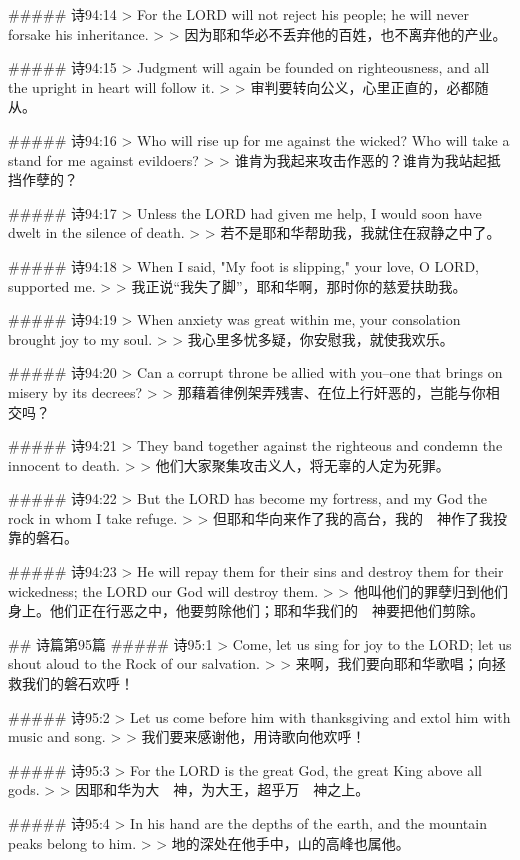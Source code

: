 ##### 诗94:14
> For the LORD will not reject his people; he will never forsake his inheritance.
>
> 因为耶和华必不丢弃他的百姓，也不离弃他的产业。


##### 诗94:15
> Judgment will again be founded on righteousness, and all the upright in heart will follow it.
>
> 审判要转向公义，心里正直的，必都随从。


##### 诗94:16
> Who will rise up for me against the wicked? Who will take a stand for me against evildoers?
>
> 谁肯为我起来攻击作恶的？谁肯为我站起抵挡作孽的？


##### 诗94:17
> Unless the LORD had given me help, I would soon have dwelt in the silence of death.
>
> 若不是耶和华帮助我，我就住在寂静之中了。


##### 诗94:18
> When I said, "My foot is slipping," your love, O LORD, supported me.
>
> 我正说“我失了脚”，耶和华啊，那时你的慈爱扶助我。


##### 诗94:19
> When anxiety was great within me, your consolation brought joy to my soul.
>
> 我心里多忧多疑，你安慰我，就使我欢乐。


##### 诗94:20
> Can a corrupt throne be allied with you--one that brings on misery by its decrees?
>
> 那藉着律例架弄残害、在位上行奸恶的，岂能与你相交吗？


##### 诗94:21
> They band together against the righteous and condemn the innocent to death.
>
> 他们大家聚集攻击义人，将无辜的人定为死罪。


##### 诗94:22
> But the LORD has become my fortress, and my God the rock in whom I take refuge.
>
> 但耶和华向来作了我的高台，我的　神作了我投靠的磐石。


##### 诗94:23
> He will repay them for their sins and destroy them for their wickedness; the LORD our God will destroy them.
>
> 他叫他们的罪孽归到他们身上。他们正在行恶之中，他要剪除他们；耶和华我们的　神要把他们剪除。


## 诗篇第95篇
##### 诗95:1
> Come, let us sing for joy to the LORD; let us shout aloud to the Rock of our salvation.
>
> 来啊，我们要向耶和华歌唱；向拯救我们的磐石欢呼！


##### 诗95:2
> Let us come before him with thanksgiving and extol him with music and song.
>
> 我们要来感谢他，用诗歌向他欢呼！


##### 诗95:3
> For the LORD is the great God, the great King above all gods.
>
> 因耶和华为大　神，为大王，超乎万　神之上。


##### 诗95:4
> In his hand are the depths of the earth, and the mountain peaks belong to him.
>
> 地的深处在他手中，山的高峰也属他。


